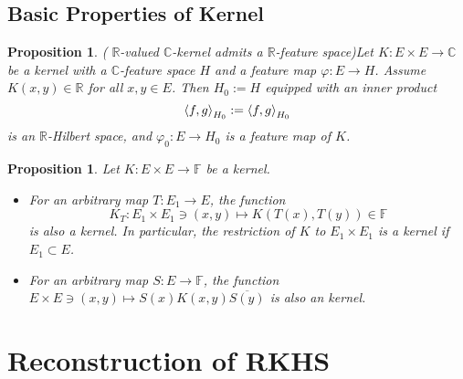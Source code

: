 \documentclass[a4paper,12pt]{article}
\newtheorem{prp}[thm]{Proposition}
\theoremstyle{remark}
\theoremstyle{definition}
\theoremstyle{definition}
\theoremstyle{definition}
\newcommand{\ip}[2]{\left<#1, #2 \right>}
\let\Re\relax
\DeclareMathOperator{\Re}{Re}
\begin{document}
\subsection{Basic Properties of Kernel}
\begin{prp} ( \( \mathbb{R} \)-valued \( \mathbb{C} \)-kernel admits a \( \mathbb{R} \)-feature space)\label{R-valued C-kernel admits a R-feature space}
	Let \( K:E \times E \to \mathbb{C} \) be a kernel with a \( \mathbb{C} \)-feature space \( H \) and a feature map \( \varphi:E \to H \). Assume \( K(x,y)\in \mathbb{R} \) for all \( x,y \in E \). Then \( H_0 := H \) equipped with an inner product
	\begin{equation*}
		\ip{f}{g}_{H_0} := \Re \ip{f}{g}_{H_0}
	\end{equation*}
	is an \( \mathbb{R} \)-Hilbert space, and \( \varphi_0:E \to H_0 \) is a feature map of \( K \).
\end{prp}

\begin{prp} \label{kernel with map is kernel}
	Let \( K:E \times E \to \mathbb{F} \) be a kernel.
	\begin{itemize}
		\item[(a)] For an arbitrary map \( T:E_1 \to E \), the function
		      \begin{equation*}
			      K_T:E_1 \times E_1 \ni (x,y)  \mapsto K(T(x),T(y)) \in \mathbb{F}
		      \end{equation*}
		      is also a kernel. In particular, the restriction of \( K \) to \( E_1 \times E_1 \) is a kernel if \( E_1 \subset E \).
		\item[(b)] For an arbitrary map \( S:E \to \mathbb{F} \), the function \(E \times E \ni (x,y) \mapsto  S(x)K(x,y)\overline{S(y)} \) is also an kernel.
	\end{itemize}
\end{prp}

\section{Reconstruction of RKHS}
\end{document}

